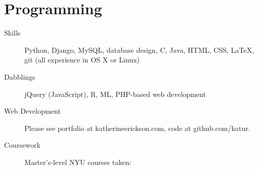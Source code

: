 \documentclass{article}
\begin{document}
	\section*{Programming}
	\begin{description}
			\item[Skills] Python, Django, MySQL, database design, C, Java, HTML, CSS, \LaTeX, git (all experience in OS X or Linux)
			\item[Dabblings] jQuery (JavaScript), R, ML, PHP-based web development
			\item[Web Development] Please see portfolio at katherineerickson.com, code at github.com/katur.
			\item[Coursework] Master's-level NYU courses taken:
				\footnotesize
				\begin{itemize}
				\end{itemize}
				\normalsize
	\end{description}
			
\end{document}
